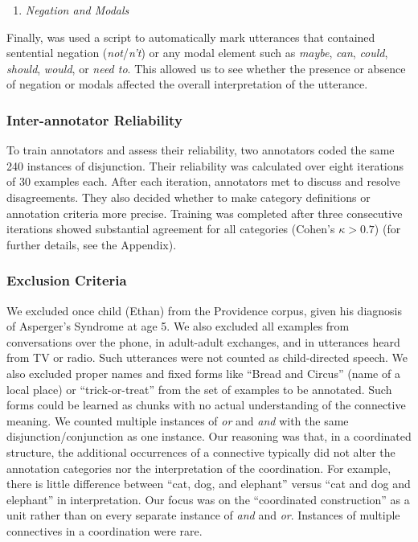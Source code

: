 \documentclass[
  english,
  ,man,floatsintext]{apa6}
\providecommand{\tightlist}{%
  \setlength{\itemsep}{0pt}\setlength{\parskip}{0pt}}
\begin{document}
\begin{enumerate}
\def\labelenumi{\arabic{enumi}.}
\setcounter{enumi}{7}
\tightlist
\item
  \emph{Negation and Modals}
\end{enumerate}

Finally, was used a script to automatically mark utterances that contained sentential negation (\emph{not}/\emph{n't}) or any modal element such as \emph{maybe}, \emph{can}, \emph{could}, \emph{should}, \emph{would}, or \emph{need to}. This allowed us to see whether the presence or absence of negation or modals affected the overall interpretation of the utterance.

\hypertarget{inter-annotator-reliability}{%
\subsubsection{Inter-annotator Reliability}\label{inter-annotator-reliability}}

To train annotators and assess their reliability, two annotators coded the same 240 instances of disjunction. Their reliability was calculated over eight iterations of 30 examples each. After each iteration, annotators met to discuss and resolve disagreements. They also decided whether to make category definitions or annotation criteria more precise. Training was completed after three consecutive iterations showed substantial agreement for all categories (Cohen's \(\kappa > 0.7\)) (for further details, see the Appendix).

\hypertarget{exclusion-criteria-1}{%
\subsubsection{Exclusion Criteria}\label{exclusion-criteria-1}}

We excluded once child (Ethan) from the Providence corpus, given his diagnosis of Asperger's Syndrome at age 5. We also excluded all examples from conversations over the phone, in adult-adult exchanges, and in utterances heard from TV or radio. Such utterances were not counted as child-directed speech. We also excluded proper names and fixed forms like ``Bread and Circus'' (name of a local place) or ``trick-or-treat'' from the set of examples to be annotated. Such forms could be learned as chunks with no actual understanding of the connective meaning. We counted multiple instances of \emph{or} and \emph{and} with the same disjunction/conjunction as one instance. Our reasoning was that, in a coordinated structure, the additional occurrences of a connective typically did not alter the annotation categories nor the interpretation of the coordination. For example, there is little difference between ``cat, dog, and elephant'' versus ``cat and dog and elephant'' in interpretation. Our focus was on the ``coordinated construction'' as a unit rather than on every separate instance of \emph{and} and \emph{or}. Instances of multiple connectives in a coordination were rare.
\end{document}
